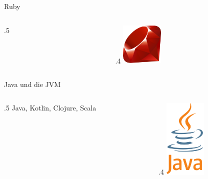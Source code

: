 \begin{frame}{Ruby}
    \begin{columns}
        \begin{column}{.5\framewidth}

        \end{column}
        \begin{column}{.4\framewidth}
            \includegraphics[width=2cm]{resources/logos/ruby}
        \end{column}
    \end{columns}
\end{frame}

\begin{frame}{Java und die JVM}
    \begin{columns}
        \begin{column}{.5\framewidth}
            Java, Kotlin, Clojure, Scala
        \end{column}
        \begin{column}{.4\framewidth}
            \includegraphics[width=2cm]{resources/logos/java}
        \end{column}
    \end{columns}
\end{frame}

